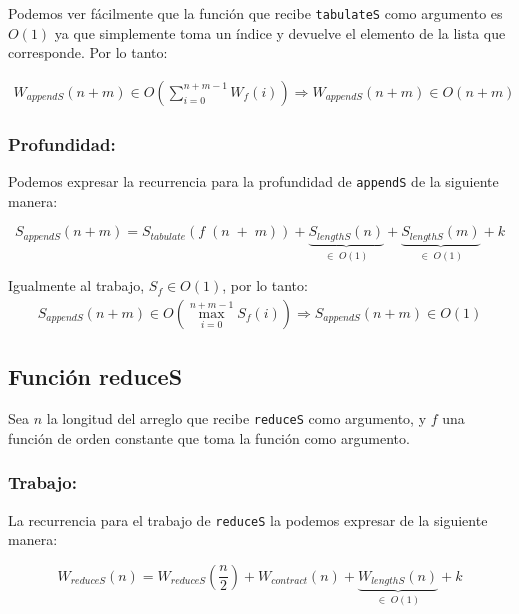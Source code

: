 \documentclass[11pt]{article}
\begin{document}
Podemos ver fácilmente que la función que recibe \texttt{tabulateS} como
argumento es $O(1)$ ya que simplemente toma un índice y devuelve el 
elemento de la lista que corresponde. Por lo tanto:

\begin{align*}
    W_{appendS}(n + m) \in O\left(\displaystyle\sum_{i=0}^{n + m - 1}W_f(i)\right)
    \Rightarrow W_{appendS}(n + m) \in O(n + m)
\end{align*}

\subsubsection{Profundidad:}
Podemos expresar la recurrencia para la profundidad de \texttt{appendS} de 
la siguiente manera:

\begin{equation*}
    S_{appendS}(n + m) = S_{tabulate}(f \; (n \; +\; m)) + \underbrace{S_{lengthS}(n)}_{\in \; O(1)}
    + \underbrace{S_{lengthS}(m)}_{\in \; O(1)} + k
\end{equation*}

Igualmente al trabajo, $S_f \in O(1)$, por lo tanto:
\begin{align*}
    S_{appendS}(n + m) \in O\left(\displaystyle\max_{i=0}^{n + m - 1}S_f(i)\right)
    \Rightarrow S_{appendS}(n + m) \in O(1)
\end{align*}


\subsection{Función reduceS}

Sea $n$ la longitud del arreglo que recibe \texttt{reduceS} como argumento, y $f$
una función de orden constante que toma la función como argumento.

\subsubsection{Trabajo:}

La recurrencia para el trabajo de \texttt{reduceS} la podemos expresar de
la siguiente manera:

\begin{equation*}
    W_{reduceS}(n) =  W_{reduceS}(\frac{n}{2}) + W_{contract}(n) + \underbrace{W_{lengthS}(n)}_{\in \; O(1)} + k
\end{equation*}
\end{document}
